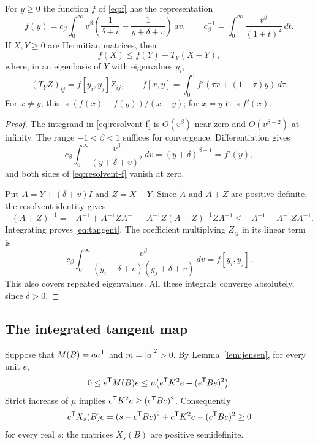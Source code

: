 \begin{lemma}\label{lem:resolvent-tangent}
For $y\ge0$ the function $f$ of \eqref{eq:f} has the representation
\begin{equation}\label{eq:resolvent-f}
 f(y)=c_\beta\int_0^\infty v^\beta
 \left(\frac1{\delta+v}-\frac1{y+\delta+v}\right)\,dv,
 \qquad
 c_\beta^{-1}=\int_0^\infty\frac{t^\beta}{(1+t)^2}\,dt.
\end{equation}
If $X,Y\ge0$ are Hermitian matrices, then
\begin{equation}\label{eq:tangent}
 f(X)\le f(Y)+T_Y(X-Y),
\end{equation}
where, in an eigenbasis of $Y$ with eigenvalues $y_i$,
\begin{equation}\label{eq:divdiff}
 (T_Y Z)_{ij}=f[y_i,y_j]Z_{ij},\qquad
 f[x,y]=\int_0^1 f'(\tau x+(1-\tau)y)\,d\tau.
\end{equation}
For $x\ne y$, this is $(f(x)-f(y))/(x-y)$; for $x=y$ it is $f'(x)$.
\end{lemma}
\begin{proof}
The integrand in \eqref{eq:resolvent-f} is $O(v^\beta)$ near zero and
$O(v^{\beta-2})$ at infinity. The range $-1<\beta<1$ suffices for convergence.
Differentiation gives
\[
 c_\beta\int_0^\infty\frac{v^\beta}{(y+\delta+v)^2}\,dv
 =(y+\delta)^{\beta-1}=f'(y),
\]
and both sides of \eqref{eq:resolvent-f} vanish at zero.

Put $A=Y+(\delta+v)I$ and $Z=X-Y$. Since $A$ and $A+Z$ are positive
definite, the resolvent identity gives
\[
 -(A+Z)^{-1}
 =-A^{-1}+A^{-1}ZA^{-1}
   -A^{-1}Z(A+Z)^{-1}ZA^{-1}
 \le -A^{-1}+A^{-1}ZA^{-1}.
\]
Integrating proves \eqref{eq:tangent}. The coefficient multiplying $Z_{ij}$
in its linear term is
\[
 c_\beta\int_0^\infty
 \frac{v^\beta}{(y_i+\delta+v)(y_j+\delta+v)}\,dv=f[y_i,y_j].
\]
This also covers repeated eigenvalues. All these integrals converge
absolutely, since $\delta>0$.
\end{proof}

\subsection{The integrated tangent map}

Suppose that $M(B)=aa^{\mathsf T}$ and $m=|a|^2>0$. By
Lemma~\ref{lem:jensen}, for every unit $e$,
\[
 0\le e^{\mathsf T}M(B)e
 \le\mu\bigl(e^{\mathsf T}K^2e-(e^{\mathsf T}Be)^2\bigr).
\]
Strict increase of $\mu$ implies
$e^{\mathsf T}K^2e\ge(e^{\mathsf T}Be)^2$. Consequently
\begin{equation}\label{eq:X-positive}
 e^{\mathsf T}X_s(B)e
 =(s-e^{\mathsf T}Be)^2
   +e^{\mathsf T}K^2e-(e^{\mathsf T}Be)^2\ge0
\end{equation}
for every real $s$: the matrices $X_s(B)$ are positive semidefinite.


